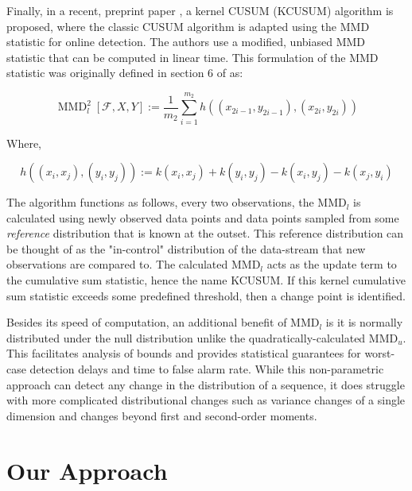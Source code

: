 Finally, in a recent, preprint paper \cite{flynn2019change}, a kernel CUSUM (KCUSUM) algorithm is proposed, where the classic CUSUM algorithm is adapted using the MMD statistic for online detection. The authors use a modified, unbiased MMD statistic that can be computed in linear time. This formulation of the MMD statistic was originally defined in section 6 of \cite{gretton2012kernel} as:

$$\operatorname{MMD}_{l}^{2}[\mathcal{F}, X, Y] :=\frac{1}{m_{2}} \sum_{i=1}^{m_{2}} h\left(\left(x_{2 i-1}, y_{2 i-1}\right),\left(x_{2 i}, y_{2 i}\right)\right)$$

Where,

$$h\left((x_i, x_j), (y_i, y_j)\right):=k\left(x_{i}, x_{j}\right)+k\left(y_{i}, y_{j}\right)-k\left(x_{i}, y_{j}\right)-k\left(x_{j}, y_{i}\right)$$

The algorithm functions as follows, every two observations, the MMD$_l$ is calculated using newly observed data points and data points sampled from some \textit{reference} distribution that is known at the outset. This reference distribution can be thought of as the "in-control" distribution of the data-stream that new observations are compared to. The calculated MMD$_l$ acts as the update term to the cumulative sum statistic, hence the name KCUSUM. If this kernel cumulative sum statistic exceeds some predefined threshold, then a change point is identified. 

Besides its speed of computation, an additional benefit of MMD$_l$ is it is normally distributed under the null distribution unlike the quadratically-calculated MMD$_u$. This facilitates analysis of bounds and provides statistical guarantees for worst-case detection delays and time to false alarm rate. While this non-parametric approach can detect any change in the distribution of a sequence, it does struggle with more complicated distributional changes such as variance changes of a single dimension and changes beyond first and second-order moments.


\section{Our Approach}

